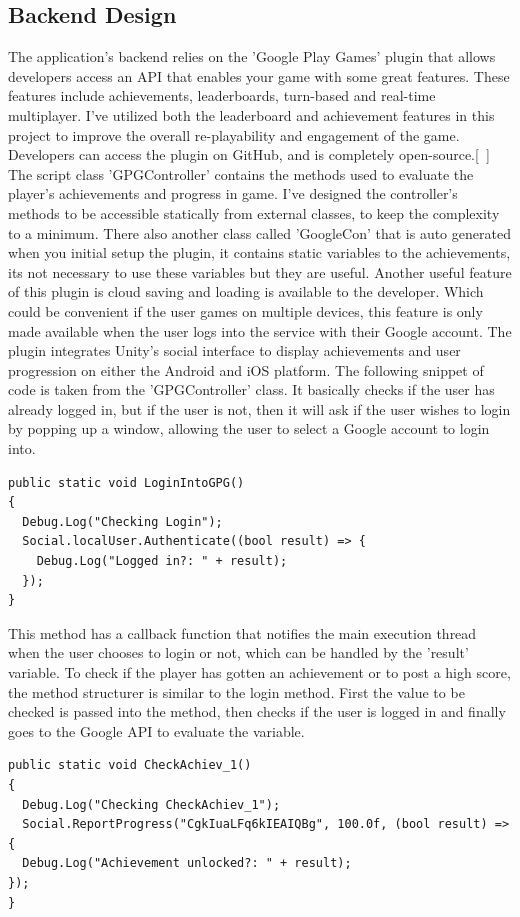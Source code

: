 \subsection{Backend Design}
The application's backend relies on the 'Google Play Games' plugin that allows developers access an API that enables your game with some great features. These features include achievements, leaderboards, turn-based and real-time multiplayer. I've utilized both the leaderboard and achievement features in this project to improve the overall re-playability and engagement of the game. Developers can access the plugin on GitHub, and is completely open-source.[~\cite{GPG-Plugin}] The script class 'GPGController' contains the methods used to evaluate the player's achievements and progress in game. I've designed the controller's methods to be accessible statically from external classes, to keep the complexity to a minimum. There also another class called 'GoogleCon' that is auto generated when you initial setup the plugin, it contains static variables to the achievements, its not necessary to use these variables but they are useful. Another useful feature of this plugin is cloud saving and loading is available to the developer. Which could be convenient if the user games on multiple devices, this feature is only made available when the user logs into the service with their Google account. The plugin integrates Unity's social interface to display achievements and user progression on either the Android and iOS platform.
The following snippet of code is taken from the 'GPGController' class. It basically checks if the user has already logged in, but if the user is not, then it will ask if the user wishes to login by popping up a window, allowing the user to select a Google account to login into.
\begin{verbatim}
public static void LoginIntoGPG()
{
  Debug.Log("Checking Login");
  Social.localUser.Authenticate((bool result) => {
    Debug.Log("Logged in?: " + result);
  });
}
\end{verbatim}
This method has a callback function that notifies the main execution thread when the user chooses to login or not, which can be handled by the 'result' variable. To check if the player has gotten an achievement or to post a high score, the method structurer is similar to the login method. First the value to be checked is passed into the method, then checks if the user is logged in and finally goes to the Google API to evaluate the variable.
\begin{verbatim}
public static void CheckAchiev_1()
{
  Debug.Log("Checking CheckAchiev_1");
  Social.ReportProgress("CgkIuaLFq6kIEAIQBg", 100.0f, (bool result) => {
  Debug.Log("Achievement unlocked?: " + result);
});
}
\end{verbatim}
